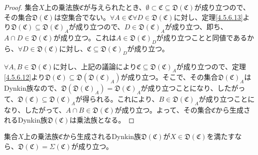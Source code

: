 \documentclass[dvipdfmx]{jsarticle}
\begin{document}
\begin{proof}
集合$X$上の乗法族$\mathfrak{C}$が与えられたとき、$\emptyset \subset \mathfrak{C} \subseteq \mathfrak{D}\left( \mathfrak{C} \right)$が成り立つので、その集合$\mathfrak{D}\left( \mathfrak{C} \right)$は空集合でない。$\forall A\in \mathfrak{C\forall}D \in \mathfrak{D}\left( \mathfrak{C} \right)$に対し、定理\ref{4.5.6.13}より$\mathfrak{D}\left( \mathfrak{C} \right) \subseteq {\mathfrak{D}\left( \mathfrak{C} \right)}_{A}$が成り立つので、$D \in {\mathfrak{D}\left( \mathfrak{C} \right)}_{A}$が成り立つ、即ち、$A \cap D \in \mathfrak{D}\left( \mathfrak{C} \right)$が成り立つ。これは$A \in {\mathfrak{D}\left( \mathfrak{C} \right)}_{D}$が成り立つことと同値であるから、$\forall D \in \mathfrak{D}\left( \mathfrak{C} \right)$に対し、$\mathfrak{C}\subseteq {\mathfrak{D}\left( \mathfrak{C} \right)}_{D}$が成り立つ。\par
$\forall A,B\in \mathfrak{D}\left( \mathfrak{C} \right)$に対し、上記の議論により$\mathfrak{C}\subseteq {\mathfrak{D}\left( \mathfrak{C} \right)}_{A}$が成り立つので、定理\ref{4.5.6.12}より$\mathfrak{D}\left( \mathfrak{C} \right)\subseteq \mathfrak{D}\left( {\mathfrak{D}\left( \mathfrak{C} \right)}_{A} \right)$が成り立つ。そこで、その集合${\mathfrak{D}\left( \mathfrak{C} \right)}_{A}$はDynkin族なので、$\mathfrak{D}\left( {\mathfrak{D}\left( \mathfrak{C} \right)}_{A} \right) = {\mathfrak{D}\left( \mathfrak{C} \right)}_{A}$が成り立つことになり、したがって、$\mathfrak{D}\left( \mathfrak{C} \right) \subseteq {\mathfrak{D}\left( \mathfrak{C} \right)}_{A}$が得られる。これにより、$B \in {\mathfrak{D}\left( \mathfrak{C} \right)}_{A}$が成り立つことになり、したがって、$A \cap B\in \mathfrak{D}\left( \mathfrak{C} \right)$が成り立つ。よって、その集合$\mathfrak{C}$から生成されるDynkin族$\mathfrak{D}\left( \mathfrak{C} \right)$は乗法族となる。
\end{proof}
\begin{thm}\label{4.5.6.19}
集合$X$上の乗法族$\mathfrak{C}$から生成されるDynkin族$\mathfrak{D}\left( \mathfrak{C} \right)$が$X \in \mathfrak{D}\left( \mathfrak{C} \right)$を満たすなら、$\mathfrak{D}\left( \mathfrak{C} \right) = \varSigma\left( \mathfrak{C} \right)$が成り立つ。
\end{thm}
\end{document}
